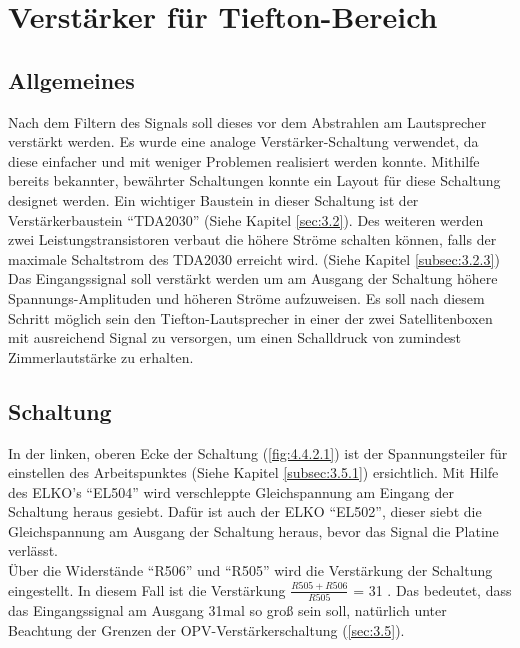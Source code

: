 \null\newpage
\section{Verstärker für Tiefton-Bereich}\label{sec:4.4}
\subsection{Allgemeines}\label{subsec:4.4.1}
Nach dem Filtern des Signals soll dieses vor dem Abstrahlen am Lautsprecher verstärkt werden.
Es wurde eine analoge Verstärker-Schaltung verwendet, da diese einfacher und mit weniger Problemen realisiert werden konnte.
Mithilfe bereits bekannter, bewährter Schaltungen konnte ein Layout für diese Schaltung designet werden.
Ein wichtiger Baustein in dieser Schaltung ist der Verstärkerbaustein \enquote{TDA2030} (Siehe Kapitel \ref{sec:3.2}).
Des weiteren werden zwei Leistungstransistoren verbaut die höhere Ströme schalten können, falls der maximale Schaltstrom des TDA2030 erreicht wird. (Siehe Kapitel \ref{subsec:3.2.3})
Das Eingangssignal soll verstärkt werden um am Ausgang der Schaltung höhere Spannungs-Amplituden und höheren Ströme aufzuweisen.
Es soll nach diesem Schritt möglich sein den Tiefton-Lautsprecher in einer der zwei Satellitenboxen mit ausreichend Signal zu versorgen, um einen Schalldruck von zumindest Zimmerlautstärke zu erhalten. 


\subsection{Schaltung}\label{subsec:4.4.2}
In der linken, oberen Ecke der Schaltung (\ref{fig:4.4.2.1}) ist der Spannungsteiler für einstellen des Arbeitspunktes (Siehe Kapitel \ref{subsec:3.5.1}) ersichtlich.
Mit Hilfe des ELKO's \enquote{EL504} wird verschleppte Gleichspannung am Eingang der Schaltung heraus gesiebt.
Dafür ist auch der ELKO \enquote{EL502}, dieser siebt die Gleichspannung am Ausgang der Schaltung heraus, bevor das Signal die Platine verlässt. \\
Über die Widerstände \enquote{R506} und \enquote{R505} wird die Verstärkung der Schaltung eingestellt.
In diesem Fall ist die Verstärkung $\frac{R505+R506}{R505}$ = 31 .
Das bedeutet, dass das Eingangssignal am Ausgang 31mal so groß sein soll, natürlich unter Beachtung der Grenzen der OPV-Verstärkerschaltung (\ref{sec:3.5}).

